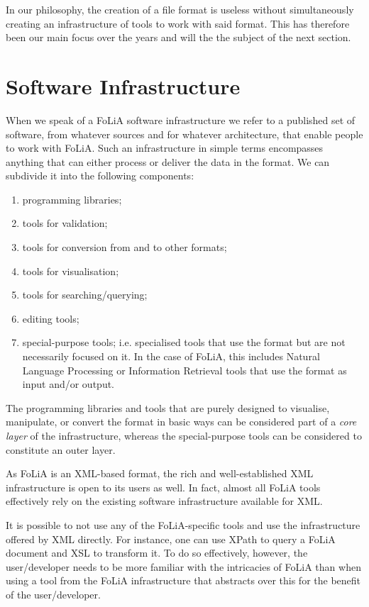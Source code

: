 \documentclass[a4paper,11pt]{article}
\begin{document}
In our philosophy, the creation of a file format is useless without
simultaneously creating an infrastructure of tools to work with said format.
This has therefore been our main focus over the years and will the the subject
of the next section.

\section{Software Infrastructure}
\label{sec:softwareinfrastructure}

When we speak of a FoLiA software infrastructure we refer to a published set of
software, from whatever sources and for whatever architecture, that enable
people to work with FoLiA. Such an infrastructure in simple terms encompasses
anything that can either process or deliver the data in the format. We can
subdivide it into the following components:

\begin{enumerate}
\item programming libraries;
\item tools for validation;
\item tools for conversion from and to other formats;
\item tools for visualisation;
\item tools for searching/querying;
\item editing tools;
\item special-purpose tools; i.e. specialised tools that use the format but are
    not necessarily focused on it. In the case of FoLiA, this includes Natural
    Language Processing or Information Retrieval tools that use the format as
    input and/or output.
\end{enumerate}

The programming libraries and tools that are purely designed to visualise,
manipulate, or convert the format in basic ways can be considered part of a
\emph{core layer} of the infrastructure, whereas the special-purpose tools can
be considered to constitute an outer layer.

As FoLiA is an XML-based format, the rich and well-established XML
infrastructure is open to its users as well. In fact, almost all FoLiA tools
effectively rely on the existing software infrastructure available for XML. 

It is possible to not use any of the FoLiA-specific tools and use the
infrastructure offered by XML directly. For instance, one can use XPath to
query a FoLiA document and XSL to transform it. To do so effectively, however,
the user/developer needs to be more familiar with the intricacies of FoLiA than when using a tool from the FoLiA infrastructure that abstracts over this
for the benefit of the user/developer.
\end{document}
